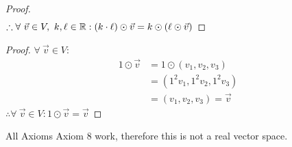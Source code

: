 \begin{enumerate}
\begin{proof}
\begin{align*}
    \end{align*}
    $\therefore \forall~\vec{v} \in V,~k,\ell \in \mathbb{R}: (k \cdot \ell) \odot \vec{v} = k \odot (\ell \odot \vec{v})$
  \end{proof}
  \begin{proof}
    $\forall~\vec{v} \in V$:
    \begin{align*}
      1 \odot \vec{v} & = 1 \odot (v_1,v_2,v_3)   \\
                      & = (1^2v_1,1^2v_2,1^2v_3)  \\
                      & = (v_1,v_2,v_3) = \vec{v}
    \end{align*}
    $\therefore \forall~\vec{v} \in V: 1 \odot \vec{v} = \vec{v}$
  \end{proof}
\end{enumerate}
All Axioms  Axiom 8 work, therefore this is not a real vector space.

